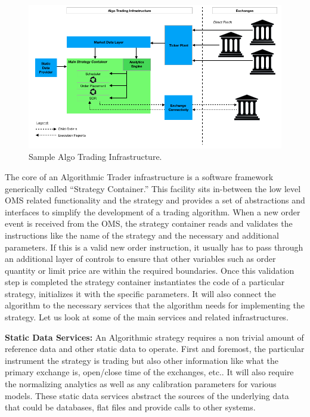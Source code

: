 	\begin{figure}[!ht]
	\centering
	\includegraphics[width=\textwidth]{chapters/chapter_tech/figures/AlgoInfraGraph.png} 
	\caption{Sample Algo Trading Infrastructure. \label{fig:AlgoInfraGraph}}
	\end{figure}
	
The core of an Algorithmic Trader infrastructure is a software framework generically called ``Strategy Container.'' This facility sits in-between the low level OMS related functionality and the strategy and provides a set of abstractions and interfaces to simplify the development of a trading algorithm. When a new order event is received from the OMS, the strategy container reads and validates the instructions like the name of the strategy and the necessary and additional parameters. If this is a valid new order instruction, it usually has to pass through an additional layer of controls to ensure that other variables such as order quantity or limit price are within the required boundaries. Once this validation step is completed the strategy container instantiates the code of a particular strategy, initializes it with the specific parameters. It will also connect the algorithm to the necessary services that the algorithm needs for implementing the strategy. Let us look at some of the main services and related infrastructures. \twomedskip


\noindent\textbf{Static Data Services:} An Algorithmic strategy requires a non trivial amount of reference data and other static data to operate. First and foremost, the particular instrument the strategy is trading but also other information like what the primary exchange is, open/close time of the exchanges, etc.. It will also require the normalizing analytics as well as any calibration parameters for various models. These static data services abstract the sources of the underlying data that could be databases, flat files and provide calls to other systems. \twomedskip


